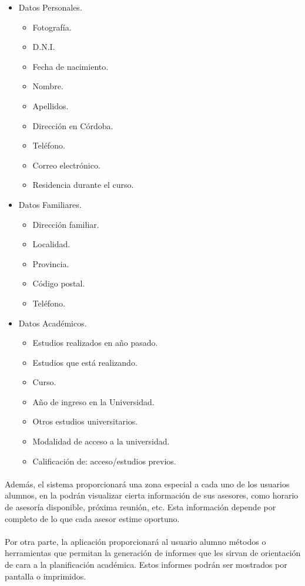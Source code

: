       \begin{itemize}
         \item Datos Personales.
         \begin{itemize}
            \item Fotografía.
            \item D.N.I.
            \item Fecha de nacimiento.
            \item Nombre.
            \item Apellidos.
            \item Dirección en Córdoba.
            \item Teléfono.
            \item Correo electrónico.
            \item Residencia durante el curso.
         \end{itemize}
         \item Datos Familiares.
         \begin{itemize}
            \item Dirección familiar.
            \item Localidad.
            \item Provincia.
            \item Código postal.
            \item Teléfono.
         \end{itemize}
         \item Datos Académicos.
         \begin{itemize}
            \item Estudios realizados en año pasado.
            \item Estudios que está realizando.
            \item Curso.
            \item Año de ingreso en la Universidad.
            \item Otros estudios universitarios.
            \item Modalidad de acceso a la universidad.
            \item Calificación de: acceso/estudios previos.
         \end{itemize}
      \end{itemize}

      \paragraph{}Además, el sistema proporcionará una zona especial
      a cada uno de los usuarios alumnos, en la podrán visualizar cierta
      información de sus asesores, como horario de asesoría disponible, próxima
      reunión, etc. Esta información depende por completo de lo que cada asesor
      estime oportuno.

      \paragraph{}Por otra parte, la aplicación proporcionará al usuario alumno
      métodos o herramientas que permitan la generación de informes que les
      sirvan de orientación de cara a la planificación académica. Estos informes
      podrán ser mostrados por pantalla o imprimidos.